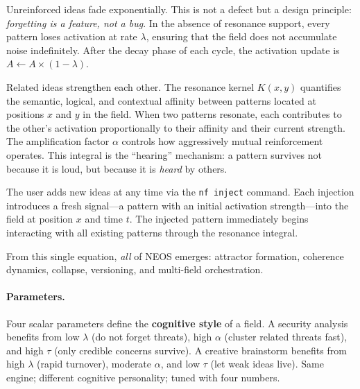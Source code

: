 \begin{description}[leftmargin=2.2cm, labelwidth=2cm, style=nextline]

\item[\boldmath$-\lambda\, A(x)$\unboldmath\quad Decay.]
  Unreinforced ideas fade exponentially.  This is not a defect but a
  design principle: \emph{forgetting is a feature, not a bug}.  In the
  absence of resonance support, every pattern loses activation at rate
  $\lambda$, ensuring that the field does not accumulate noise
  indefinitely.  After the decay phase of each cycle, the activation
  update is $A \leftarrow A \times (1 - \lambda)$.

\item[\boldmath$\alpha \int K(x,y)\, A(y)\, dy$\unboldmath\quad Resonance.]
  Related ideas strengthen each other.  The resonance kernel
  $K(x,y)$ quantifies the semantic, logical, and contextual affinity
  between patterns located at positions $x$ and $y$ in the field.
  When two patterns resonate, each contributes to the other's
  activation proportionally to their affinity and their current
  strength.  The amplification factor $\alpha$ controls how aggressively
  mutual reinforcement operates.  This integral is the ``hearing''
  mechanism: a pattern survives not because it is loud, but because it
  is \emph{heard} by others.

\item[\boldmath$\iota(x,t)$\unboldmath\quad Injection.]
  The user adds new ideas at any time via the \texttt{nf inject}
  command.  Each injection introduces a fresh signal---a pattern with
  an initial activation strength---into the field at position $x$ and
  time $t$.  The injected pattern immediately begins interacting with
  all existing patterns through the resonance integral.

\end{description}

\noindent
From this single equation, \emph{all} of NEOS emerges: attractor
formation, coherence dynamics, collapse, versioning, and multi-field
orchestration.

\paragraph{Parameters.}
Four scalar parameters define the \textbf{cognitive style} of a field.
A security analysis benefits from low $\lambda$ (do not forget
threats), high $\alpha$ (cluster related threats fast), and high $\tau$
(only credible concerns survive).  A creative brainstorm benefits from
high $\lambda$ (rapid turnover), moderate $\alpha$, and low $\tau$
(let weak ideas live).  Same engine; different cognitive personality;
tuned with four numbers.

